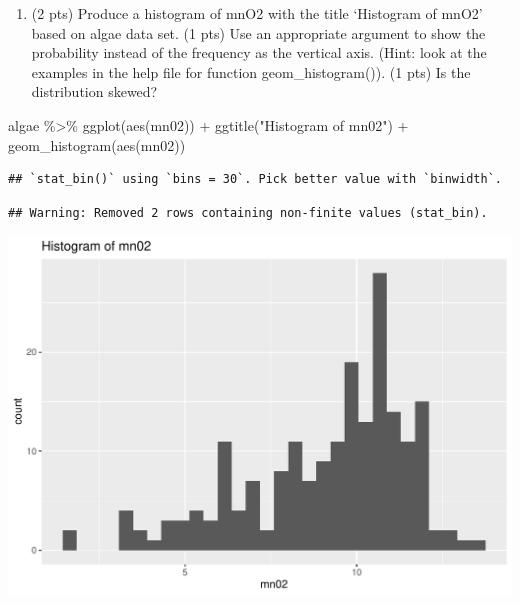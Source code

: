 \documentclass[
]{article}
\newenvironment{Shaded}{\begin{snugshade}}{\end{snugshade}}
\newcommand{\FunctionTok}[1]{\textcolor[rgb]{0.00,0.00,0.00}{#1}}
\newcommand{\NormalTok}[1]{#1}
\newcommand{\SpecialCharTok}[1]{\textcolor[rgb]{0.00,0.00,0.00}{#1}}
\newcommand{\StringTok}[1]{\textcolor[rgb]{0.31,0.60,0.02}{#1}}
\providecommand{\tightlist}{%
  \setlength{\itemsep}{0pt}\setlength{\parskip}{0pt}}
\begin{document}
\begin{enumerate}
\def\labelenumi{\alph{enumi}.}
\tightlist
\item
  (2 pts) Produce a histogram of mnO2 with the title `Histogram of mnO2'
  based on algae data set. (1 pts) Use an appropriate argument to show
  the probability instead of the frequency as the vertical axis. (Hint:
  look at the examples in the help file for function geom\_histogram()).
  (1 pts) Is the distribution skewed?
\end{enumerate}

\begin{Shaded}
\begin{Highlighting}[]
\NormalTok{algae }\SpecialCharTok{\%\textgreater{}\%}
  \FunctionTok{ggplot}\NormalTok{(}\FunctionTok{aes}\NormalTok{(mn02)) }\SpecialCharTok{+} \FunctionTok{ggtitle}\NormalTok{(}\StringTok{"Histogram of mn02"}\NormalTok{) }\SpecialCharTok{+}
  \FunctionTok{geom\_histogram}\NormalTok{(}\FunctionTok{aes}\NormalTok{(mn02))}
\end{Highlighting}
\end{Shaded}

\begin{verbatim}
## `stat_bin()` using `bins = 30`. Pick better value with `binwidth`.
\end{verbatim}

\begin{verbatim}
## Warning: Removed 2 rows containing non-finite values (stat_bin).
\end{verbatim}

\includegraphics{homework-1-131_files/figure-latex/unnamed-chunk-6-1.pdf}
\end{document}
